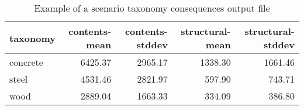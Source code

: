 \begin{table}[htbp]
\centering
\begin{tabular}{lrrrr}

\hline
\rowcolor{lightgray}
\bf{taxonomy} & \bf{contents-mean} & \bf{contents-stddev} & \bf{structural-mean} & \bf{structural-stddev} \\
\hline
concrete & 6425.37 & 2965.17 & 1338.30 & 1661.46 \\
steel & 4531.46 & 2821.97 & 597.90 & 743.71 \\
wood & 2889.04 & 1663.33 & 334.09 & 386.80 \\
\hline

\end{tabular}
\caption{Example of a scenario taxonomy consequences output file}
\label{output:scenario_consequence_taxonomy}
\end{table}